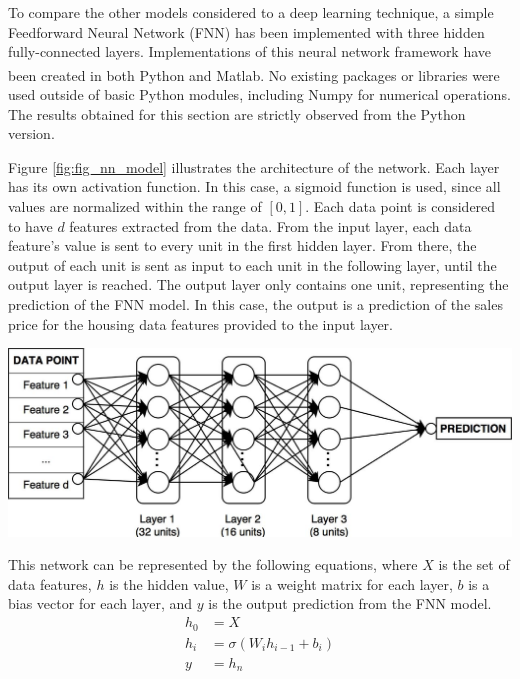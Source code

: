 \documentclass[10pt]{article}
\begin{document}
\begin{multicols}{2}
		To compare the other models considered to a deep learning technique, a simple Feedforward Neural Network (FNN) has been implemented with three hidden fully-connected layers. Implementations of this neural network framework have been created in both Python and Matlab\textsuperscript{\cite{git_repo}}. No existing packages or libraries were used outside of basic Python modules, including Numpy for numerical operations. The results obtained for this section are strictly observed from the Python version.
		
		Figure \ref{fig:fig_nn_model} illustrates the architecture of the network. Each layer has its own activation function. In this case, a sigmoid function is used, since all values are normalized within the range of \([0, 1]\). Each data point is considered to have \(d\) features extracted from the data. From the input layer, each data feature's value is sent to every unit in the first hidden layer. From there, the output of each unit is sent as input to each unit in the following layer, until the output layer is reached. The output layer only contains one unit, representing the prediction of the FNN model. In this case, the output is a prediction of the sales price for the housing data features provided to the input layer.
		
		\begin{center}
            \captionsetup{type=figure}
			\includegraphics[scale=0.15]{NeuralNet/fig_nn_01} \\
			\label{fig:fig_nn_model}
		\end{center}
	
		This network can be represented by the following equations, where \(X\) is the set of data features, \(h\) is the hidden value, \(W\) is a weight matrix for each layer, \(b\) is a bias vector for each layer, and \(y\) is the output prediction from the FNN model.
		\begin{align}
			h_{0} &= X \nonumber \\
			h_{i} &= \sigma(W_{i}h_{i-1} + b_{i}) \nonumber \\
			y &= h_{n} \nonumber
		\end{align}
	

\end{multicols}
\end{document}
